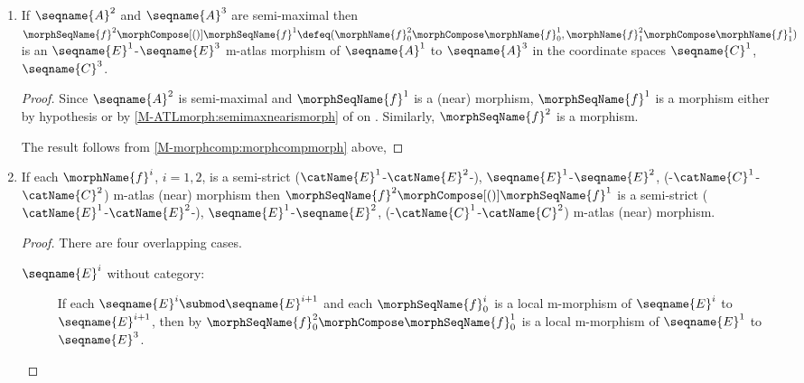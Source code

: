 \documentclass{article}
\begin{document}
\begin{lemma}
\begin{enumerate}
\begin{proof}
The result follows from \cref{M-morphcomp:morphcompmorph} above,
\end{proof}

\item
\label{M-morphcomp:nearcompnear2}
If $\seqname{A}^2$ and $\seqname{A}^3$ are semi-maximal then
$
  \morphSeqName{f}^2 \morphCompose[()] \morphSeqName{f}^1 \defeq
  (
    \morphName{f}^2_0 \morphCompose \morphName{f}^1_0,
    \morphName{f}^2_1 \morphCompose \morphName{f}^1_1
  )
$
is an $\seqname{E}^1$-$\seqname{E}^3$ m-atlas morphism of
$\seqname{A}^1$ to $\seqname{A}^3$ in the coordinate spaces
$\seqname{C}^1$, $\seqname{C}^3$.

\begin{proof}
Since $\seqname{A}^2$ is semi-maximal and $\morphSeqName{f}^1$ is a
(near) morphism, $\morphSeqName{f}^1$
is a morphism either by hypothesis
or by \cref{M-ATLmorph:semimaxnearismorph} of
{
  \showlabelsinline
   on
  .
}
Similarly, $\morphSeqName{f}^2$ is a morphism.

The result follows from \cref{M-morphcomp:morphcompmorph} above,
\end{proof}

\item
\label{M-morphcomp:semicompsemi}
If each $\morphName{f}^i$, $i=1,2$, is a semi-strict
\nobreaks
  {
    {($\catName{E}^1$-$\catName{E}^2$-)},
    {$\seqname{E}^1$-$\seqname{E}^2$},
    {(-$\catName{C}^1$-$\catName{C}^2$)}
  }
m-atlas (near) morphism
then $\morphSeqName{f}^2 \morphCompose[()] \morphSeqName{f}^1$ is a semi-strict
\nobreaks
  {
    {($\catName{E}^1$-$\catName{E}^2$-)},
    {$\seqname{E}^1$-$\seqname{E}^2$},
    {(-$\catName{C}^1$-$\catName{C}^2$)}
  }
m-atlas (near) morphism.

\begin{proof}
There are four overlapping cases.
\begin{description}
\item[$\seqname{E}^i$ without category:]
If each $\seqname{E}^i \submod \seqname{E}^{i+1}$ and each
$\morphSeqName{f}^i_0$ is a local m-morphism of $\seqname{E}^i$ to
$\seqname{E}^{i+1}$, then by 
$\morphSeqName{f}^2_0 \morphCompose \morphSeqName{f}^1_0$ is a local
m-morphism of $\seqname{E}^1$ to $\seqname{E}^3$.


\end{description}
\end{proof}
\end{enumerate}
\end{lemma}
\end{document}
